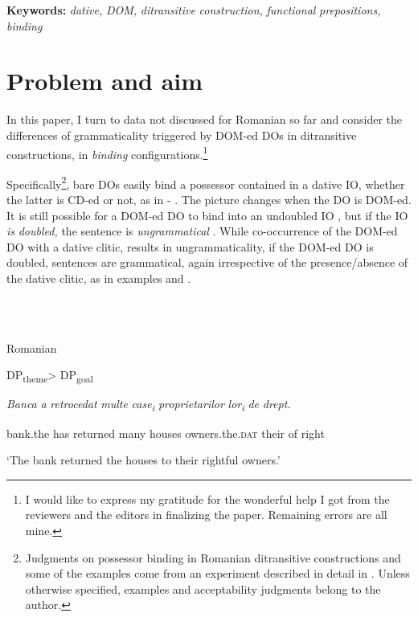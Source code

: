 \documentclass[output=paper,colorlinks,citecolor=brown]{./langscibook}
\begin{document}
\textbf{Keywords:} \textit{dative,} \textit{DOM,} \textit{ditransitive} \textit{construction,} \textit{functional} \textit{prepositions,} \textit{binding}

\section{Problem and aim} %

In this paper, I turn to data not discussed for Romanian so far and consider the differences of grammaticality triggered by DOM-ed DOs in ditransitive constructions, in \textit{binding} configurations.\footnote{I would like to express my gratitude for the wonderful help I got from the reviewers and the editors in finalizing the paper. Remaining errors are all mine.}

Specifically\footnote{Judgments on possessor binding in Romanian ditransitive constructions and some of the examples come from an experiment described in detail in \citet{CornilescuDinuTigău2017DOC}. Unless otherwise specified, examples and acceptability judgments belong to the author.}, bare DOs easily bind a possessor contained in a dative IO, whether the latter is CD-ed or not, as in  - . The picture changes when the DO is DOM-ed. It is still possible for a DOM-ed DO to bind into an undoubled IO , but if the IO \textit{is} \textit{doubled,} the sentence is \textit{ungrammatical} . While co-occurrence of the DOM-ed DO with a dative clitic, results in ungrammaticality, if the DOM-ed \textsc{DO} is doubled, sentences are grammatical, again irrespective of the presence/absence of the dative clitic, as in examples  and .

\ea%
    \label{ex:key:1}
    \gll\\
        \\
    \glt
    \z

          Romanian \citep[162]{CornilescuDinuTigău2017Dative}

  DP\textsubscript{theme}> DP\textsubscript{goal}

\textit{Banca}  \textit{a} \textit{retrocedat}  \textit{multe} \textit{case\textsubscript{i}}  \textit{proprietarilor}     \textit{lor\textsubscript{i}}  \textit{de} \textit{drept.}

bank.the has returned  many houses  owners.the.\textsc{dat}    their  of right

‘The bank returned the houses to their rightful owners.’
\end{document}
